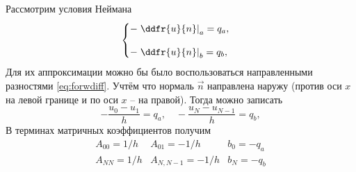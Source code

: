 Рассмотрим условия Неймана
\begin{equation}
	\label{eq:poisson1d_bc2}
	\begin{cases}
        -\left.\ddfr{u}{n}\right|_a=q_a,\\[10pt]
        -\left.\ddfr{u}{n}\right|_b=q_b,
	\end{cases}
\end{equation}
Для их аппроксимации можно бы было воспользоваться направленными
разностями \cref{eq:forwdiff}. Учтём что нормаль $\vec n$ направлена наружу (против оси $x$ на левой границе и по оси $x$ -- на правой).
Тогда можно записать
\begin{equation}
- \frac{u_0 - u_1}{h} = q_a, \quad
- \frac{u_N - u_{N-1}}{h} = q_b,
\end{equation}
В терминах матричных коэффициентов получим
\begin{equation}
\label{eq:poisson1d_bc2_o1}
\begin{array}{lll}
A_{00} = 1/h & A_{01} = -1/h & b_0 = -q_a \\
A_{NN} = 1/h & A_{N,N-1} = -1/h & b_N = -q_b
\end{array}
\end{equation}

